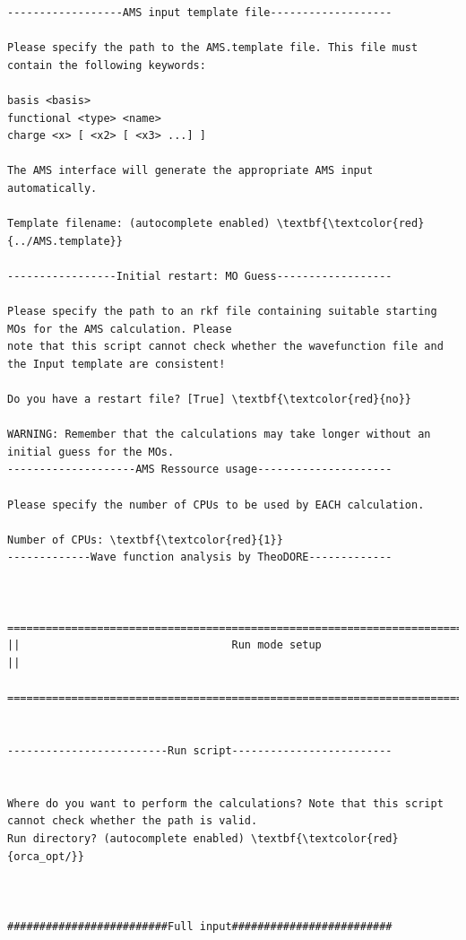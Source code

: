 \documentclass[a4paper,11pt,DIV=15,openany]{scrbook}
\begin{document}
\begin{oframed}
\begin{Verbatim}[commandchars=\\\{\}]
------------------AMS input template file-------------------

Please specify the path to the AMS.template file. This file must contain the following keywords:

basis <basis>
functional <type> <name>
charge <x> [ <x2> [ <x3> ...] ]

The AMS interface will generate the appropriate AMS input automatically.

Template filename: (autocomplete enabled) \textbf{\textcolor{red}{../AMS.template}}

-----------------Initial restart: MO Guess------------------

Please specify the path to an rkf file containing suitable starting MOs for the AMS calculation. Please 
note that this script cannot check whether the wavefunction file and the Input template are consistent!

Do you have a restart file? [True] \textbf{\textcolor{red}{no}}

WARNING: Remember that the calculations may take longer without an initial guess for the MOs.
--------------------AMS Ressource usage---------------------

Please specify the number of CPUs to be used by EACH calculation.

Number of CPUs: \textbf{\textcolor{red}{1}}
-------------Wave function analysis by TheoDORE-------------


  ================================================================================
||                                 Run mode setup                                 ||
  ================================================================================


-------------------------Run script-------------------------


Where do you want to perform the calculations? Note that this script cannot check whether the path is valid.
Run directory? (autocomplete enabled) \textbf{\textcolor{red}{orca_opt/}}



#########################Full input#########################


\end{Verbatim}
\end{oframed}
\end{document}
